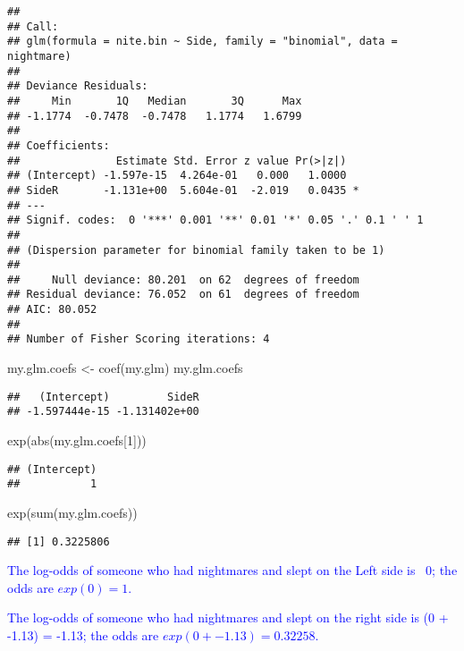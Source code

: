 \documentclass[
]{article}
\newenvironment{Shaded}{\begin{snugshade}}{\end{snugshade}}
\newcommand{\DecValTok}[1]{\textcolor[rgb]{0.00,0.00,0.81}{#1}}
\newcommand{\FunctionTok}[1]{\textcolor[rgb]{0.00,0.00,0.00}{#1}}
\newcommand{\NormalTok}[1]{#1}
\newcommand{\OtherTok}[1]{\textcolor[rgb]{0.56,0.35,0.01}{#1}}
\begin{document}
\begin{verbatim}
## 
## Call:
## glm(formula = nite.bin ~ Side, family = "binomial", data = nightmare)
## 
## Deviance Residuals: 
##     Min       1Q   Median       3Q      Max  
## -1.1774  -0.7478  -0.7478   1.1774   1.6799  
## 
## Coefficients:
##               Estimate Std. Error z value Pr(>|z|)  
## (Intercept) -1.597e-15  4.264e-01   0.000   1.0000  
## SideR       -1.131e+00  5.604e-01  -2.019   0.0435 *
## ---
## Signif. codes:  0 '***' 0.001 '**' 0.01 '*' 0.05 '.' 0.1 ' ' 1
## 
## (Dispersion parameter for binomial family taken to be 1)
## 
##     Null deviance: 80.201  on 62  degrees of freedom
## Residual deviance: 76.052  on 61  degrees of freedom
## AIC: 80.052
## 
## Number of Fisher Scoring iterations: 4
\end{verbatim}

\begin{Shaded}
\begin{Highlighting}[]
\NormalTok{my.glm.coefs }\OtherTok{\textless{}{-}} \FunctionTok{coef}\NormalTok{(my.glm)}
\NormalTok{my.glm.coefs}
\end{Highlighting}
\end{Shaded}

\begin{verbatim}
##   (Intercept)         SideR 
## -1.597444e-15 -1.131402e+00
\end{verbatim}

\begin{Shaded}
\begin{Highlighting}[]
\FunctionTok{exp}\NormalTok{(}\FunctionTok{abs}\NormalTok{(my.glm.coefs[}\DecValTok{1}\NormalTok{]))}
\end{Highlighting}
\end{Shaded}

\begin{verbatim}
## (Intercept) 
##           1
\end{verbatim}

\begin{Shaded}
\begin{Highlighting}[]
\FunctionTok{exp}\NormalTok{(}\FunctionTok{sum}\NormalTok{(my.glm.coefs))}
\end{Highlighting}
\end{Shaded}

\begin{verbatim}
## [1] 0.3225806
\end{verbatim}

\textcolor{blue}{The log-odds of someone who had nightmares and slept on the Left side is ~0; the odds are $exp(0) = 1$. }

\textcolor{blue}{The log-odds of someone who had nightmares and slept on the right side is (0 + -1.13) = -1.13; the odds are $exp(0 + -1.13) = 0.32258$. }

\vspace{0.5in}
\end{document}
